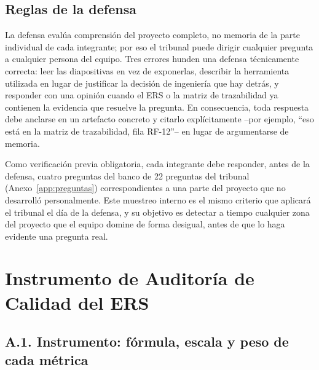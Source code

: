 \documentclass[journal,onecolumn]{IEEEtran}
\begin{document}
	\subsection*{Reglas de la defensa}
	La defensa evalúa comprensión del proyecto completo, no memoria de la parte
	individual de cada integrante; por eso el tribunal puede dirigir cualquier
	pregunta a cualquier persona del equipo. Tres errores hunden una defensa
	técnicamente correcta: leer las diapositivas en vez de exponerlas, describir
	la herramienta utilizada en lugar de justificar la decisión de ingeniería
	que hay detrás, y responder con una opinión cuando el ERS o la matriz de
	trazabilidad ya contienen la evidencia que resuelve la pregunta. En
	consecuencia, toda respuesta debe anclarse en un artefacto concreto y
	citarlo explícitamente --por ejemplo, ``eso está en la matriz de
	trazabilidad, fila RF-12''-- en lugar de argumentarse de memoria.
	
	Como verificación previa obligatoria, cada integrante debe responder, antes
	de la defensa, cuatro preguntas del banco de 22 preguntas del tribunal
	(Anexo~\ref{app:preguntas}) correspondientes a una parte del proyecto que no desarrolló
	personalmente. Este muestreo interno es el mismo criterio que aplicará el
	tribunal el día de la defensa, y su objetivo es detectar a tiempo cualquier
	zona del proyecto que el equipo domine de forma desigual, antes de que lo
	haga evidente una pregunta real.
	\newpage
	
	\printbibliography[title={Referencias}]
	
	\newpage
	
	\appendices
	
	\section{Instrumento de Auditoría de Calidad del ERS}
	\label{app:auditoria}
		\subsection*{A.1. Instrumento: fórmula, escala y peso de cada métrica}
	
\end{document}
